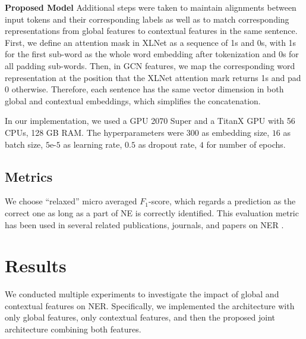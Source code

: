 \documentclass[runningheads]{llncs}
\begin{document}
\noindent\textbf{Proposed Model}
Additional steps were taken to maintain alignments between input tokens and their corresponding labels as well as to match corresponding representations from global features to contextual features in the same sentence. First, we define an attention mask in XLNet as a sequence of 1s and 0s, with 1s for the first sub-word as the whole word embedding after tokenization and 0s for all padding sub-words. Then, in GCN features, we map the corresponding word representation at the position that the XLNet attention mark returns 1s and pad 0 otherwise. Therefore, each sentence has the same vector dimension in both global and contextual embeddings, which simplifies the concatenation. 

In our implementation, we used a GPU 2070 Super and a TitanX GPU with 56 CPUs, 128 GB RAM. The hyperparameters were $300$ as embedding size, $16$ as batch size,  $5$e-$5$ as learning rate, $0.5$ as dropout rate, $4$ for number of epochs.

\subsection{Metrics}








We choose ``relaxed'' micro averaged $F_1$-score, which regards a prediction as the correct one as long as a part of NE is correctly identified. This evaluation metric has been used in several related publications, journals, and papers on NER \cite{takeuchi2002use} \cite{huang2015bidirectional} \cite{lample2016neural} \cite{ma2016end}.
\vspace{-0.2cm}
\section{Results}
\label{sec:results}
We conducted multiple experiments to investigate the impact of global and contextual features on NER.  Specifically, we implemented the architecture with only global features, only contextual features, and then the proposed joint architecture combining both features. 
\end{document}
